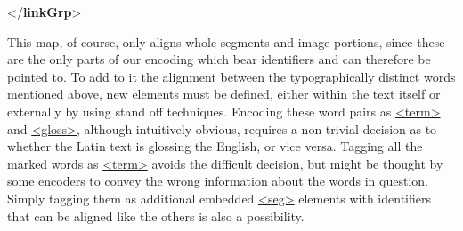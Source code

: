 \begin{shaded}
\mbox{}\newline 
{}\mbox{}\newline 
{}\mbox{}\newline 
{}\mbox{}\newline 
{}\mbox{}\newline 
{}\mbox{}\newline 
{}\mbox{}\newline 
{}\mbox{}\newline 
{</\textbf{linkGrp}>}\end{shaded}\egroup\par \par
This map, of course, only aligns whole segments and image portions, since these are the only parts of our encoding which bear identifiers and can therefore be pointed to. To add to it the alignment between the typographically distinct words mentioned above, new elements must be defined, either within the text itself or externally by using stand off techniques. Encoding these word pairs as \hyperref[TEI.term]{<term>} and \hyperref[TEI.gloss]{<gloss>}, although intuitively obvious, requires a non-trivial decision as to whether the Latin text is glossing the English, or vice versa. Tagging all the marked words as \hyperref[TEI.term]{<term>} avoids the difficult decision, but might be thought by some encoders to convey the wrong information about the words in question. Simply tagging them as additional embedded \hyperref[TEI.seg]{<seg>} elements with identifiers that can be aligned like the others is also a possibility.\par
